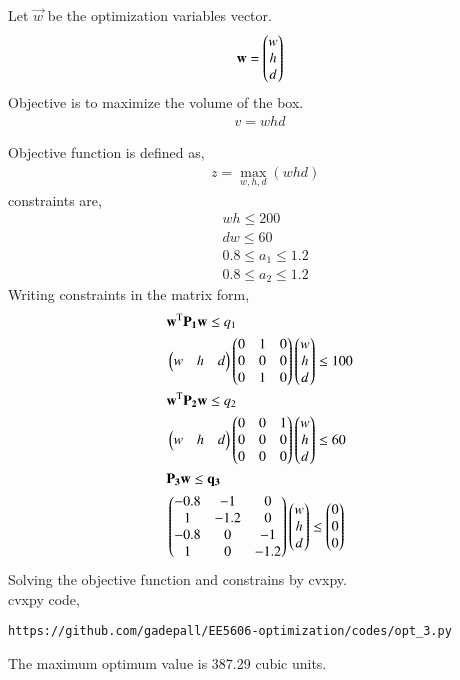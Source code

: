\documentclass[journal,12pt,twocolumn]{IEEEtran}
\begin{document}
\begin{enumerate}
Let $\vec{w}$ be the optimization variables vector.
\begin{align}
\mathbf{w} = \begin{pmatrix}w\\h\\d\end{pmatrix}
\end{align}
Objective is to maximize the volume of the box. \\
\begin{align}
{v=whd} \nonumber
\end{align}

Objective function is defined as,
\begin{align}
&z= \max_{w,h,d} (whd)
\end{align}
constraints are,
\begin{align}
& {wh\leq 200}\\
&{ dw \leq 60}\\
&{0.8\leq a_1\leq 1.2}\\
&{0.8\leq a_2 \leq 1.2}
\end{align}
Writing constraints in the matrix form, 
\begin{align}
&\mathbf{w}^\text{T}\mathbf{P_1}\mathbf{w} \leq q_1\\
& \begin{pmatrix}w&h&d\end{pmatrix}\begin{pmatrix}0&1&0\\0&0&0\\0&1&0\end{pmatrix}\begin{pmatrix}w\\h\\d\end{pmatrix} \leq 100\\
&\mathbf{w}^\text{T}\mathbf{P_2}\mathbf{w} \leq q_2\\
& \begin{pmatrix}w&h&d\end{pmatrix}\begin{pmatrix}0&0&1\\0&0&0\\0&0&0\end{pmatrix}\begin{pmatrix}w\\h\\d\end{pmatrix} \leq 60\\
&\mathbf{P_3}\mathbf{w}\leq \mathbf{q_3}\\
&\begin{pmatrix}-0.8&-1&0\\1&-1.2&0\\-0.8&0&-1\\1&0&-1.2\end{pmatrix} \begin{pmatrix}w\\h\\d\end{pmatrix} \leq \begin{pmatrix}0\\0\\0\end{pmatrix}
 \end{align}
Solving the objective function and constrains by cvxpy.\\
cvxpy code,
\begin{lstlisting}
https://github.com/gadepall/EE5606-optimization/codes/opt_3.py
\end{lstlisting}
The maximum optimum value is 387.29 cubic units.\\

\end{enumerate}
\end{document}
